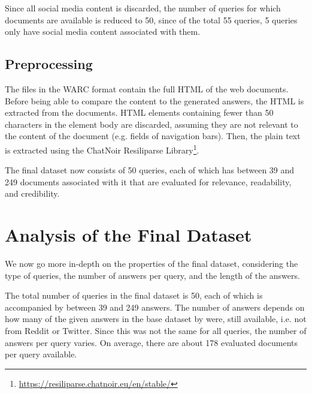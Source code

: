 Since all social media content is discarded, the number of queries for which documents are available is reduced to 50, since of the total 55 queries, 5 queries only have social media content associated with them.

\subsection{Preprocessing}
The files in the WARC format contain the full HTML of the web documents.
Before being able to compare the content to the generated answers, the HTML is extracted from the documents.
HTML elements containing fewer than 50 characters in the element body are discarded, assuming they are not relevant to the content of the document (e.g. fields of navigation bars).
Then, the plain text is extracted using the ChatNoir Resiliparse Library\footnote{\url{https://resiliparse.chatnoir.eu/en/stable/}}.

The final dataset now consists of 50 queries, each of which has between 39 and 249 documents associated with it that are evaluated for relevance, readability, and credibility.

\section{Analysis of the Final Dataset}
We now go more in-depth on the properties of the final dataset, considering the type of queries, the number of answers per query, and the length of the answers.

The total number of queries in the final dataset is 50, each of which is accompanied by between 39 and 249 answers.
The number of answers depends on how many of the given answers in the base dataset by \cite{goeuriot:2021:Consumer} were, still available, i.e. not from Reddit or Twitter.
Since this was not the same for all queries, the number of answers per query varies.
On average, there are about 178 evaluated documents per query available.

